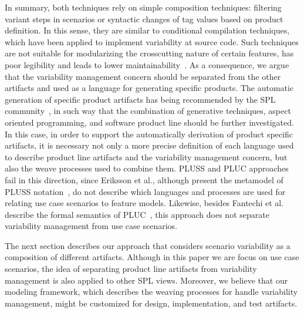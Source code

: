 In summary, both techniques rely on simple composition techniques: filtering variant steps in scenarios or syntactic changes of tag values based on product definition. In this sense, they are similar to conditional compilation techniques, which have been applied to implement variability at source code. Such techniques are not suitable for modularizing the crosscutting nature of certain features, has poor legibility and leads to lower maintainability~\cite{alves-gpce-06}. 
As a consequence, we argue that the variability management concern should be separated from the other artifacts and used as a language for generating specific products. The automatic generation of specific product artifacts has being recommended by the SPL community~\cite{krueger-cacm-200712,greenfield-softwarefactories,czarnecki-book}, in such way that the combination of generative techniques, aspect oriented programming, and software product line should be further investigated. In this case, in order to support the automatically derivation of product specific artifacts, it is necessary not only a more precise definition of each language used to describe product line artifacts and the variability management concern, but also the weave processes used to combine them. PLUSS and PLUC approaches fail in this direction, since Eriksson et al., although present the metamodel of PLUSS notation~\cite{eriksson-splc-2005}, do not describe which languages and processes are used for relating use case scenarios to feature models. Likewise, besides Fantechi et al. describe the formal semantics of PLUC~\cite{fantechi-splc-2004}, this approach does not separate variability management from use case scenarios.

The next section describes our approach that considers scenario variability as a composition of different artifacts. Although in this paper we are focus on use case scenarios, the idea of separating product line artifacts from variability management is also applied to other SPL views. Moreover, we believe that our modeling framework, which describes the weaving processes for handle variability management, might be customized for design, implementation, and test artifacts. 





